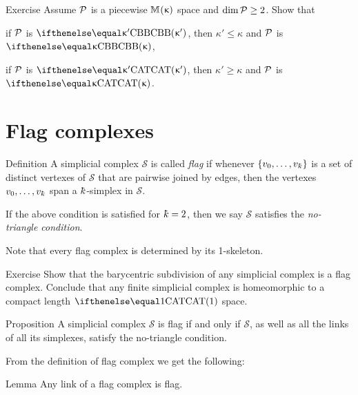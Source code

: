\begin{thm}{Exercise}\label{ex:polyKk}
Assume $\mathcal{P}$ is a piecewise
$\mathbb{M}_{{}}^{}({\upkappa})$ space and $\dim \spc{P}\ge 2$. 
Show that 

\begin{subthm}{} if $\mathcal{P}$ is $\Alex{\kappa'}$, then $\kappa'\le \kappa$ and $\mathcal{P}$ is $\Alex{\kappa}$, 
\end{subthm}

\begin{subthm}{}
if $\mathcal{P}$ is $\CAT{\kappa'}$, then $\kappa'\ge \kappa$ and $\mathcal{P}$ is $\CAT\kappa$.
\end{subthm}

\end{thm}

\section{Flag complexes}


\begin{thm}{Definition}
A simplicial complex $\mathcal{S}$ 
is called \emph{flag} if whenever $\{v_0,\z\dots,v_\kay\}$
is a set of distinct vertexes of $\mathcal{S}$
that are pairwise joined by edges, then the vertexes $v_0,\dots,v_\kay$
span a $\kay$-simplex in $\mathcal{S}$.

If the above condition is satisfied for $\kay=2$, 
then we say $\mathcal{S}$ satisfies 
the \emph{no-triangle condition}.
\end{thm}

Note that every flag complex is determined by its 1-skeleton.

\begin{thm}{Exercise}\label{ex:barycenric-flag}
Show that the barycentric subdivision of any simplicial complex is a flag complex.
Conclude that any finite  simplicial complex is homeomorphic to a compact length $\CAT1$ space.
\end{thm}


\begin{thm}{Proposition}\label{prop:no-trig}
A simplicial complex $\mathcal{S}$ is flag if and only if 
$\mathcal{S}$, as well as all the links of all its simplexes,
satisfy the no-triangle condition.
\end{thm}

From the definition of flag complex 
we get the following:

\begin{thm}{Lemma}\label{lem:link-of-flag}
Any link of a flag complex is flag.
\end{thm}


